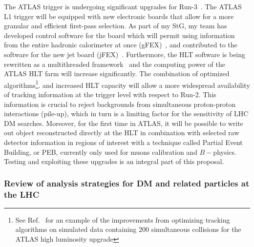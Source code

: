 The ATLAS trigger is undergoing significant upgrades for Run-3~\cite{Aad:1602235}. 
The ATLAS L1 trigger will be equipped with new electronic boards that allow for a more granular and efficient first-pass selection. 
As part of my StG, my team has developed control software for the board which will permit using information from the entire hadronic calorimeter at once (gFEX)~\cite{Tang:2016ded}, 
and contributed to the software for the new jet board (jFEX)~\cite{Bauss:2018nde}. 
Furthermore, the HLT software is being rewritten as a multithreaded framework~\cite{Bielski:2674286} and the computing power of the ATLAS HLT farm will increase significantly. 
The combination of optimized algorithms\footnote{See Ref.~\cite{ATL-PHYS-PUB-2019-041} %
for an example of the improvements from optimizing tracking algorithms on simulated data containing 200 simultaneous collisions for the ATLAS high luminosity upgrade}. 
and increased HLT capacity will allow a more widespread availability of tracking information at the trigger level with respect to Run-2. 
This information is crucial to reject backgrounds from simultaneous proton-proton interactions (pile-up), which in turn is a limiting factor for the sensitivity of LHC DM searches. 
Moreover, for the first time in ATLAS, it will be possible to write out object reconstructed directly at the HLT in combination with selected raw detector information in regions of interest with a technique called Partial Event Building, or PEB, currently only used for muons calibration and $B-$physics. 
Testing and exploiting these upgrades is an integral part of this proposal. 


\subsubsection{Review of analysis strategies for DM and related particles at the LHC}

